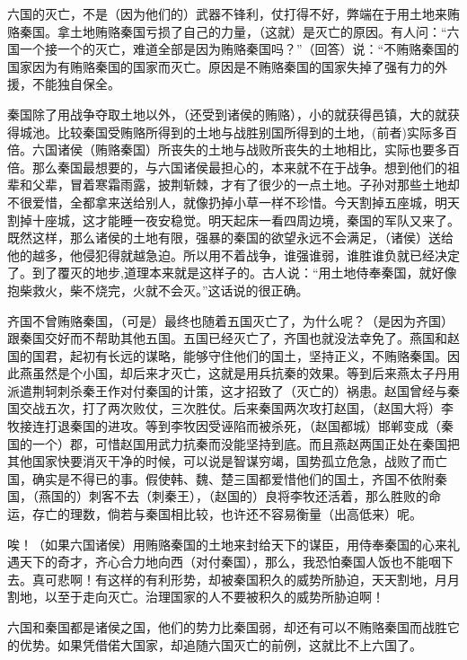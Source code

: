 \documentclass[12pt,UTF-8,openany]{ctexbook}
\begin{document}
\begin{normalsize}
    
    六国的灭亡，不是（因为他们的）武器不锋利，仗打得不好，弊端在于用土地来贿赂秦国。拿土地贿赂秦国亏损了自己的力量，（这就）是灭亡的原因。有人问：“六国一个接一个的灭亡，难道全部是因为贿赂秦国吗？”（回答）说：“不贿赂秦国的国家因为有贿赂秦国的国家而灭亡。原因是不贿赂秦国的国家失掉了强有力的外援，不能独自保全。
    
    秦国除了用战争夺取土地以外，（还受到诸侯的贿赂），小的就获得邑镇，大的就获得城池。比较秦国受贿赂所得到的土地与战胜别国所得到的土地，(前者)实际多百倍。六国诸侯（贿赂秦国）所丧失的土地与战败所丧失的土地相比，实际也要多百倍。那么秦国最想要的，与六国诸侯最担心的，本来就不在于战争。想到他们的祖辈和父辈，冒着寒霜雨露，披荆斩棘，才有了很少的一点土地。子孙对那些土地却不很爱惜，全都拿来送给别人，就像扔掉小草一样不珍惜。今天割掉五座城，明天割掉十座城，这才能睡一夜安稳觉。明天起床一看四周边境，秦国的军队又来了。既然这样，那么诸侯的土地有限，强暴的秦国的欲望永远不会满足，（诸侯）送给他的越多，他侵犯得就越急迫。所以用不着战争，谁强谁弱，谁胜谁负就已经决定了。到了覆灭的地步,道理本来就是这样子的。古人说：“用土地侍奉秦国，就好像抱柴救火，柴不烧完，火就不会灭。”这话说的很正确。
    
    齐国不曾贿赂秦国，（可是）最终也随着五国灭亡了，为什么呢？（是因为齐国）跟秦国交好而不帮助其他五国。五国已经灭亡了，齐国也就没法幸免了。燕国和赵国的国君，起初有长远的谋略，能够守住他们的国土，坚持正义，不贿赂秦国。因此燕虽然是个小国，却后来才灭亡，这就是用兵抗秦的效果。等到后来燕太子丹用派遣荆轲刺杀秦王作对付秦国的计策，这才招致了（灭亡的）祸患。赵国曾经与秦国交战五次，打了两次败仗，三次胜仗。后来秦国两次攻打赵国，（赵国大将）李牧接连打退秦国的进攻。等到李牧因受诬陷而被杀死，（赵国都城）邯郸变成（秦国的一个）郡，可惜赵国用武力抗秦而没能坚持到底。而且燕赵两国正处在秦国把其他国家快要消灭干净的时候，可以说是智谋穷竭，国势孤立危急，战败了而亡国，确实是不得已的事。假使韩、魏、楚三国都爱惜他们的国土，齐国不依附秦国，（燕国的）刺客不去（刺秦王），（赵国的）良将李牧还活着，那么胜败的命运，存亡的理数，倘若与秦国相比较，也许还不容易衡量（出高低来）呢。
    
    唉！（如果六国诸侯）用贿赂秦国的土地来封给天下的谋臣，用侍奉秦国的心来礼遇天下的奇才，齐心合力地向西（对付秦国），那么，我恐怕秦国人饭也不能咽下去。真可悲啊！有这样的有利形势，却被秦国积久的威势所胁迫，天天割地，月月割地，以至于走向灭亡。治理国家的人不要被积久的威势所胁迫啊！
    
    六国和秦国都是诸侯之国，他们的势力比秦国弱，却还有可以不贿赂秦国而战胜它的优势。如果凭借偌大国家，却追随六国灭亡的前例，这就比不上六国了。
    
\end{normalsize}
\end{document}
